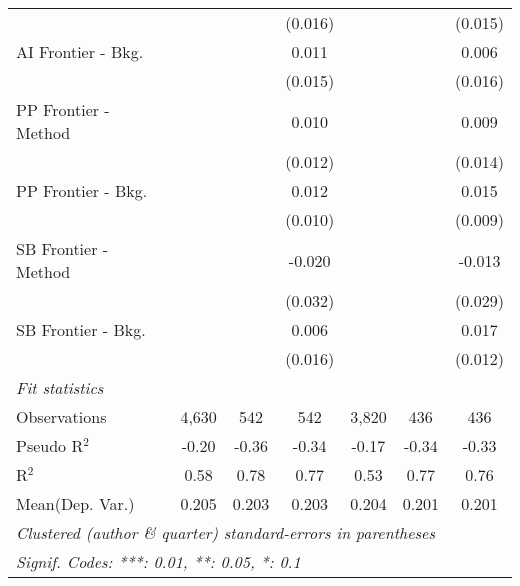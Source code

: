\begin{tabular}{lcccccc}
                               &               &               & (0.016)     &               &               & (0.015)\\   
   AI Frontier - Bkg.          &               &               & 0.011       &               &               & 0.006\\   
                               &               &               & (0.015)     &               &               & (0.016)\\   
   PP Frontier - Method        &               &               & 0.010       &               &               & 0.009\\   
                               &               &               & (0.012)     &               &               & (0.014)\\   
   PP Frontier - Bkg.          &               &               & 0.012       &               &               & 0.015\\   
                               &               &               & (0.010)     &               &               & (0.009)\\   
   SB Frontier - Method        &               &               & -0.020      &               &               & -0.013\\   
                               &               &               & (0.032)     &               &               & (0.029)\\   
   SB Frontier - Bkg.          &               &               & 0.006       &               &               & 0.017\\   
                               &               &               & (0.016)     &               &               & (0.012)\\   
   \midrule
   \emph{Fit statistics}\\
   Observations                & 4,630         & 542           & 542         & 3,820         & 436           & 436\\  
   Pseudo R$^2$                & -0.20         & -0.36         & -0.34       & -0.17         & -0.34         & -0.33\\  
   R$^2$                       & 0.58          & 0.78          & 0.77        & 0.53          & 0.77          & 0.76\\  
Mean(Dep. Var.) & 0.205 & 0.203 & 0.203 & 0.204 & 0.201 & 0.201 \\
   \midrule \midrule
   \multicolumn{7}{l}{\emph{Clustered (author \& quarter) standard-errors in parentheses}}\\
   \multicolumn{7}{l}{\emph{Signif. Codes: ***: 0.01, **: 0.05, *: 0.1}}\\
\end{tabular}
\par\endgroup
